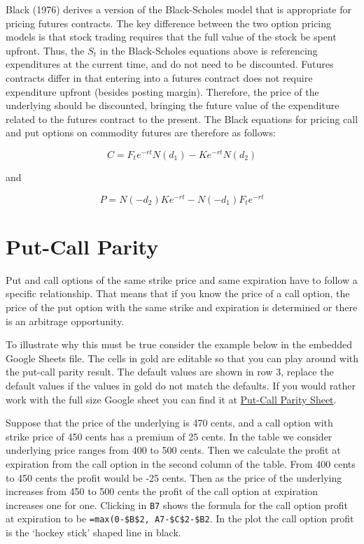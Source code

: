 \documentclass[
  letterpaper,
  DIV=11,
  numbers=noendperiod]{scrreprt}
\begin{document}
Black (1976) derives a version of the Black-Scholes model that is
appropriate for pricing futures contracts. The key difference between
the two option pricing models is that stock trading requires that the
full value of the stock be spent upfront. Thus, the \(S_{t}\) in the
Black-Scholes equations above is referencing expenditures at the current
time, and do not need to be discounted. Futures contracts differ in that
entering into a futures contract does not require expenditure upfront
(besides posting margin). Therefore, the price of the underlying should
be discounted, bringing the future value of the expenditure related to
the futures contract to the present. The Black equations for pricing
call and put options on commodity futures are therefore as follows:

\[
C = F_{t} e^{-rt} N(d_{1}) - K e^{-rt} N(d_{2})
\]

and

\[
P = N(-d_{2}) K e^{-rt} - N(-d_{1}) F_{t} e^{-rt}
\]

\hypertarget{put-call-parity}{%
\section{Put-Call Parity}\label{put-call-parity}}

Put and call options of the same strike price and same expiration have
to follow a specific relationship. That means that if you know the price
of a call option, the price of the put option with the same strike and
expiration is determined or there is an arbitrage opportunity.

To illustrate why this must be true consider the example below in the
embedded Google Sheets file. The cells in gold are editable so that you
can play around with the put-call parity result. The default values are
shown in row 3, replace the default values if the values in gold do not
match the defaults. If you would rather work with the full size Google
sheet you can find it at
\href{https://docs.google.com/spreadsheets/d/1ivvTGqC9R4L3zkG8c4ApDg8dC1LHj4v_8uLjgiurxX0/edit?usp=sharing}{Put-Call
Parity Sheet}.

Suppose that the price of the underlying is 470 cents, and a call option
with strike price of 450 cents has a premium of 25 cents. In the table
we consider underlying price ranges from 400 to 500 cents. Then we
calculate the profit at expiration from the call option in the second
column of the table. From 400 cents to 450 cents the profit would be -25
cents. Then as the price of the underlying increases from 450 to 500
cents the profit of the call option at expiration increases one for one.
Clicking in \texttt{B7} shows the formula for the call option profit at
expiration to be \texttt{=max(0-\$B\$2,\ A7-\$C\$2-\$B2}. In the plot
the call option profit is the `hockey stick' shaped line in black.
\end{document}
